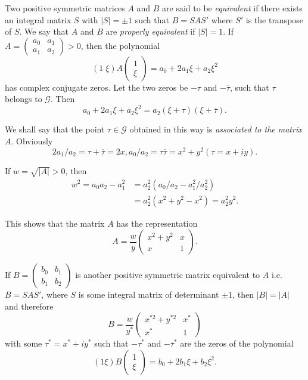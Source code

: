 \begin{defi*}
Two positive symmetric matrices $A$ and $B$ are said to be
\textit{equivalent} if there exists an integral matrix $S$ with
$|S|=\pm 1$ such that $B=SAS'$ where $S'$ is the transpose of $S$. We
say that $A$ and $B$ are \textit{properly equivalent} if $|S|=1$. If
$A=\left(\begin{smallmatrix} a_0 & a_1\\ a_1
  &a_2\end{smallmatrix}\right)>0$, then the polynomial
$$
(1 \; \xi) A \begin{pmatrix}
1\\\xi  \end{pmatrix} = a_0 + 2 a_1 \xi + a_2 \xi^2
$$
has complex conjugate zeros. Let the two zeros be $-\tau$ and
$-\overline{\tau}$, such that $\tau$ belongs to $\mathscr{G}$. Then 
$$
a_0+2a_1\xi+a_2 \xi^2 = a_2 (\xi + \tau)(\xi+\overline{\tau}).
$$

We shall say that the point $\tau \in \mathscr{G}$ obtained in
this way is \textit{associated to the matrix} \pageoriginale
$A$. Obviously
$$
2a_1/a_2 = \tau + \overline{\tau} = 2x, a_0/a_2 = \tau \overline{\tau}
= x^2+y^2 (\tau =x+iy).
$$ 

If $w=\sqrt{|A|}>0$, then 
\begin{align*}
w^2 = a_0 a_2 - a^2_1 & = a^2_2 (a_0/a_2-a^2_1/a^2_2)\\
& = a^2_2 (x^2+y^2-x^2) = a^2_2 y^2.
\end{align*}

This shows that the matrix $A$ has the representation
$$
A = \frac{w}{y} \begin{pmatrix}
x^2+y^2 & x\\
x & 1
\end{pmatrix}.
$$

If $B = \left(\begin{smallmatrix} b_0 & b_1\\b_1 &
  b_2 \end{smallmatrix}\right)$ is another positive symmetric matrix
equivalent to $A$ i.e. $B=SAS'$, where $S$ is some integral matrix of
determinant $\pm 1$, then $|B|=|A|$ and therefore 
$$
B=\frac{w}{y^{\ast}} \begin{pmatrix} 
x^{\ast 2} + y^{\ast 2} & x^{\ast}\\
x^{\ast} & 1
\end{pmatrix}
$$
with some $\tau^{\ast} = x^{\ast} + iy^{\ast}$ such that
$-\tau^{\ast}$ and $-\overline{\tau}^{\ast}$ are the zeros of the
polynomial
$$
(1\xi) B \begin{pmatrix}
1\\\xi
\end{pmatrix} = b_0 + 2b_1 \xi + b_2 \xi^2.
$$


\end{defi*}
